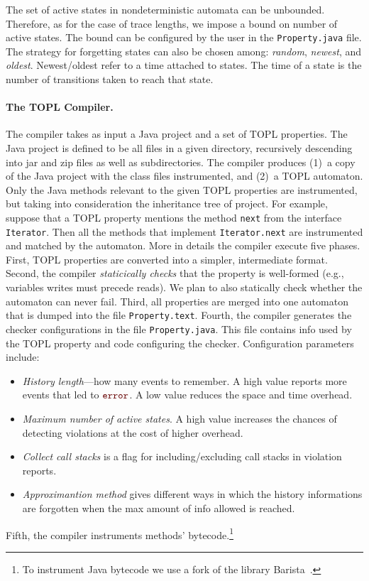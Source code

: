 \documentclass[9pt, preprint]{sigplanconf} %
\newcommand{\error}{\ensuremath{\textcolor{darkred}{\mathtt{error}}}\xspace}
\theoremstyle{definition}
\theoremstyle{remark}
\begin{document}
The set of active states in nondeterministic automata can be unbounded.
Therefore, as for the case of trace lengths, we impose a bound on number of active states. 
The bound can be configured by the user  in the {\tt Property.java}  file.  
The  strategy for forgetting states can also be chosen among: {\em random}, {\em newest}, and {\em oldest}.
Newest\slash oldest refer to a time attached to states.
The time  of a state is the number of transitions  taken to reach that state.


\paragraph{The TOPL Compiler.} \label{sec:toplc} %
The compiler takes as input a Java project and a set of TOPL properties.
The Java project is defined to be all files in a given directory, recursively descending into jar and zip files as well as  subdirectories.
The compiler produces (1)~a copy of the Java project with the class files instrumented, and (2)~a TOPL automaton.
Only the Java methods relevant to the given TOPL properties are instrumented, but taking into consideration 
 the inheritance tree of  project.
For example, suppose that a TOPL property mentions the method {\tt next} from the interface {\tt Iterator}.
Then all the methods that implement {\tt Iterator.next} are instrumented and  matched by the automaton.
%
More in details the compiler execute  five phases.
First, TOPL properties are converted into a simpler, intermediate format. 
Second, the compiler  {\em staticically checks}  that the property is well-formed (e.g., variables writes must precede reads). We plan to also statically check whether the automaton can never fail.
%
Third,  all properties are merged into one automaton that is  dumped into the file {\tt Property.text}.
%
Fourth, the compiler generates the checker configurations in 
the file {\tt Property.java}. This file contains 
info used by the TOPL property and code configuring the checker.
Configuration parameters include:
\begin{itemize}
\item \emph{History length}---how many events to remember.
  A high value reports more events that led to \error.
  A low value reduces the space and time overhead.
\item \emph{Maximum number of active states}.
  A high value increases the chances of detecting violations at the cost of higher  overhead.

\item \emph{Collect call stacks} is a flag for including/excluding  call stacks in violation reports.
%
\item {\em Approximantion method} gives different ways in which the history informations are forgotten when  the max amount of info 
allowed is reached.
\end{itemize}
%
Fifth, the compiler instruments methods' bytecode.\footnote{To instrument Java bytecode we use a fork of the library 
Barista~\cite{barista}.}
\end{document}
